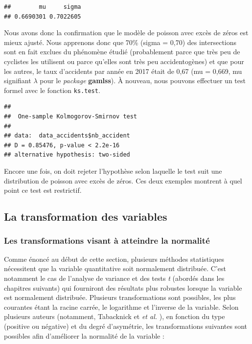 \documentclass[
  11pt,
  french,
]{book}
\makeatletter
\newenvironment{Shaded}{\begin{snugshade}}{\end{snugshade}}
\newcommand{\DataTypeTok}[1]{\textcolor[rgb]{0.13,0.29,0.53}{#1}}
\newcommand{\KeywordTok}[1]{\textcolor[rgb]{0.13,0.29,0.53}{\textbf{#1}}}
\newcommand{\NormalTok}[1]{#1}
\newcommand{\OperatorTok}[1]{\textcolor[rgb]{0.81,0.36,0.00}{\textbf{#1}}}
\newcommand{\StringTok}[1]{\textcolor[rgb]{0.31,0.60,0.02}{#1}}
\newenvironment{kframe}{%
\medskip{}
\setlength{\fboxsep}{.8em}
 \def\at@end@of@kframe{}%
 \ifinner\ifhmode%
  \def\at@end@of@kframe{\end{minipage}}%
  \begin{minipage}{\columnwidth}%
 \fi\fi%
 \def\FrameCommand##1{\hskip\@totalleftmargin \hskip-\fboxsep
 \colorbox{shadecolor}{##1}\hskip-\fboxsep
     \hskip-\linewidth \hskip-\@totalleftmargin \hskip\columnwidth}%
 \MakeFramed {\advance\hsize-\width
   \@totalleftmargin\z@ \linewidth\hsize
   \@setminipage}}%
 {\par\unskip\endMakeFramed%
 \at@end@of@kframe}
\renewenvironment{Shaded}{\begin{kframe}}{\end{kframe}}
\makeatother
\begin{document}
\begin{verbatim}
##        mu     sigma 
## 0.6690301 0.7022605
\end{verbatim}

Nous avons donc la confirmation que le modèle de poisson avec excès de zéros est mieux ajusté. Nous apprenons donc que 70\% (sigma = 0,70) des intersections sont en fait exclues du phénomène étudié (probablement parce que très peu de cyclistes les utilisent ou parce qu'elles sont très peu accidentogènes) et que pour les autres, le taux d'accidents par année en 2017 était de 0,67 (mu = 0,669, mu signifiant \(\lambda\) pour le \emph{package} \textbf{gamlss}). À nouveau, nous pouvons effectuer un test formel avec le fonction \texttt{ks.test}.

\begin{Shaded}
\end{Shaded}

\begin{verbatim}
## 
## 	One-sample Kolmogorov-Smirnov test
## 
## data:  data_accidents$nb_accident
## D = 0.85476, p-value < 2.2e-16
## alternative hypothesis: two-sided
\end{verbatim}

Encore une fois, on doit rejeter l'hypothèse selon laquelle le test suit une distribution de poisson avec excès de zéros. Ces deux exemples montrent à quel point ce test est restrictif.

\hypertarget{sect0255}{%
\subsection{La transformation des variables}\label{sect0255}}

\hypertarget{sect02551}{%
\subsubsection{Les transformations visant à atteindre la normalité}\label{sect02551}}

Comme énoncé au début de cette section, plusieurs méthodes statistiques nécessitent que la variable quantitative soit normalement distribuée. C'est notamment le cas de l'analyse de variance et des tests \emph{t} (abordés dans les chapitres suivants) qui fourniront des résultats plus robustes lorsque la variable est normalement distribuée. Plusieurs transformations sont possibles, les plus courantes étant la racine carrée, le logarithme et l'inverse de la variable. Selon plusieurs auteurs (notamment, Tabacknick et \emph{et al.} \citeyearpar[p.~89]{tabachnick2007}), en fonction du type (positive ou négative) et du degré d'asymétrie, les transformations suivantes sont possibles afin d'améliorer la normalité de la variable :
\end{document}
